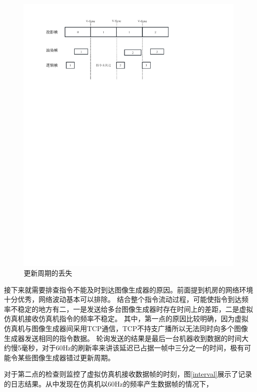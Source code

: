 \begin{figure}[h!]
    \begin{center}
        \includegraphics[width=\textwidth]{pictures/tearreason.pdf}
        \caption{更新周期的丢失}
        \label{tearreason}
    \end{center}
\end{figure}
\par 
接下来就需要排查指令不能及时到达图像生成器的原因。前面提到机房的网络环境十分优秀，网络波动基本可以排除。
结合整个指令流动过程，可能使指令到达频率不稳定的地方有二，一是发送给多台图像生成器时存在时间上的差距，二是虚拟仿真机接收仿真机指令的频率不稳定。
其中，第一点的原因比较明确，因为虚拟仿真机与图像生成器间采用TCP通信，TCP不持支广播所以无法同时向多个图像生成器发送相同的指令数据。
轮询发送的结果是最后一台机器收到数据的时间大约慢5毫秒，对于60Hz的刷新率来讲该延迟已占据一帧中三分之一的时间，极有可能令某些图像生成器错过更新周期。
\par
对于第二点的检查则监控了虚拟仿真机接收数据帧的时刻，图\ref{interval}展示了记录的日志结果。从中发现在仿真机以60Hz的频率产生数据帧的情况下，
